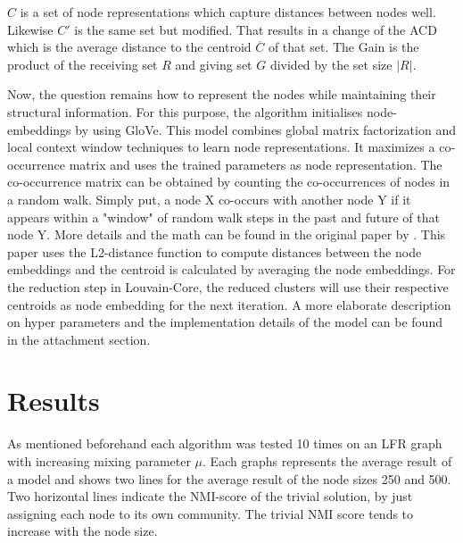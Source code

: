 \documentclass[11pt, twocolumn]{article}
\begin{document}
$C$ is a set of node representations which capture distances between nodes well. Likewise $C'$ is the same set but modified. That results in a change of the ACD which is the average distance to the centroid $\overline{C}$ of that set. The Gain is the product of the receiving set $R$ and giving set $G$ divided by the set size $|R|$. 

Now, the question remains how to represent the nodes while maintaining their structural information. For this purpose, the algorithm initialises node-embeddings by using GloVe. This model combines global matrix factorization and local context window techniques to learn node representations. It maximizes a co-occurrence matrix and uses the trained parameters as node representation. The co-occurrence matrix can be obtained by counting the co-occurrences of nodes in a random walk. Simply put, a node X co-occurs with another node Y if it appears within a "window" of random walk steps in the past and future of that node Y. More details and the math can be found in the original paper by \citeauthor{pennington_GloveGlobalVectors_2014}. This paper uses the L2-distance function to compute distances between the node embeddings and the centroid is calculated by averaging the node embeddings. For the reduction step in Louvain-Core, the reduced clusters will use their respective centroids as node embedding for the next iteration. A more elaborate description on hyper parameters and the implementation details of the model can be found in the attachment section. 



\section{Results}
\label{sec:results}
As mentioned beforehand each algorithm was tested 10 times on an LFR graph with increasing mixing parameter $\mu$. Each graphs represents the average result of a model and shows two lines for the average result of the node sizes 250 and 500. Two horizontal lines indicate the NMI-score of the trivial solution, by just assigning each node to its own community. The trivial NMI score tends to increase with the node size.
\end{document}
